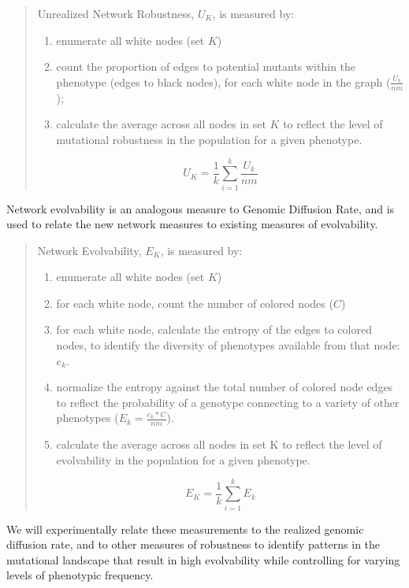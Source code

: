 \begin{quote}

Unrealized Network Robustness, $U_K$, is measured by:
\begin{enumerate}
\item enumerate all white nodes (set $K$)
\item count the proportion of edges to potential mutants within the phenotype (edges to black nodes), for each white node in the graph ($\frac{U_k}{nm}$);
\item calculate the average across all nodes in set $K$ to reflect the level of mutational robustness in the population for a given phenotype.
\end{enumerate}

\begin{equation}
U_{K} =  {\frac{1}{k} \sum_{i=1}^{k}}\frac{U_k}{nm} 
\end{equation}
\end{quote}

Network evolvability is an analogous measure to Genomic Diffusion Rate, and is used to relate the new network measures to existing measures of evolvability.

\begin{quote}


Network Evolvability, $E_K$, is measured by:
\begin{enumerate}
\item enumerate all white nodes (set $K$)
\item for each white node, count the number of colored nodes ($C$)
\item for each white node, calculate the entropy of the edges to colored nodes, to identify the diversity of phenotypes available from that node: $e_k$.
\item normalize the entropy against the total number of colored node edges to reflect the probability of a genotype connecting to a variety of other phenotypes ($E_k=\frac{{e_{k}}*C}{nm}$).
\item calculate the average across all nodes in set K to reflect the level of evolvability in the population for a given phenotype.
\end{enumerate}

\begin{equation}
E_{K} =  {\frac{1}{k} \sum_{i=1}^{k}} E_k 
\end{equation}

\end{quote}

We will experimentally relate these measurements to the realized genomic diffusion rate, and to other measures of robustness to identify patterns in the mutational landscape that result in high evolvability while controlling for varying levels of phenotypic frequency.